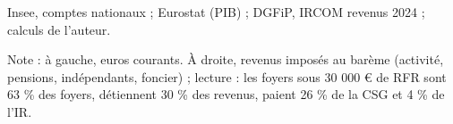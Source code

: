 Insee, comptes nationaux ; Eurostat (PIB) ; DGFiP, IRCOM revenus 2024 ; calculs de l'auteur.\par Note : à gauche, euros courants. À droite, revenus imposés au barème (activité, pensions, indépendants, foncier) ; lecture : les foyers sous 30 000 \euro{} de RFR sont 63 \% des foyers, détiennent 30 \% des revenus, paient 26 \% de la CSG et 4 \% de l'IR.
